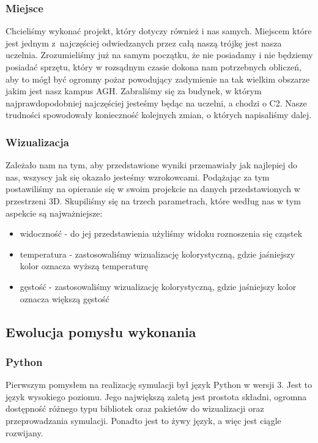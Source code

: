 \documentclass{article}
\begin{document}
	
	\subsubsection{Miejsce}
	Chcieliśmy wykonać projekt, który dotyczy również i nas samych. Miejscem które jest jednym z~najczęściej odwiedzanych przez całą naszą trójkę jest nasza uczelnia. Zrozumieliśmy już na samym początku, że nie posiadamy i nie będziemy posiadać sprzętu, który w rozsądnym czasie dokona nam potrzebnych obliczeń, aby to mógł być ogromny pożar powodujący zadymienie na tak wielkim obszarze jakim jest nasz kampus AGH. Zabraliśmy się za budynek, w którym najprawdopodobniej najczęściej jesteśmy będąc na uczelni, a chodzi o C2. Nasze trudności spowodowały konieczność kolejnych zmian, o których napisaliśmy dalej.
	
	
	\subsubsection{Wizualizacja}
	Zależało nam na tym, aby przedstawione wyniki przemawiały jak najlepiej do nas, wszyscy jak się okazało jesteśmy wzrokowcami. Podążając za tym postawiliśmy na opieranie się w swoim projekcie na danych przedstawionych w przestrzeni 3D. Skupiliśmy się na trzech parametrach, które według nas w tym aspekcie są najważniejsze:
	\begin{itemize}
		\item widoczność - do jej przedstawienia użyliśmy widoku roznoszenia się cząstek
		\item temperatura - zastosowaliśmy wizualizację kolorystyczną, gdzie jaśniejszy kolor oznacza wyższą temperaturę
		\item gęstość - zastosowaliśmy wizualizację kolorystyczną, gdzie jaśniejszy kolor oznacza większą gęstość
	\end{itemize}
	
	\vspace{7mm} 
	\subsection{Ewolucja pomysłu wykonania}
	
	\medskip
	\medskip
	\subsubsection{Python}
	Pierwszym pomysłem na realizację symulacji był język Python w wersji 3. Jest to język wysokiego poziomu. Jego największą zaletą jest prostota składni, ogromna dostępność różnego typu bibliotek oraz pakietów do wizualizacji oraz przeprowadzania symulacji. Ponadto jest to żywy język, a więc jest ciągle rozwijany. 
	
\end{document}
